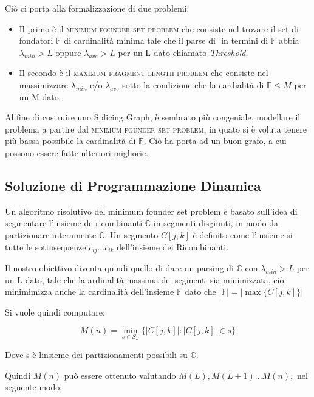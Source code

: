 Ciò ci porta alla formalizzazione di due problemi:

\begin{itemize}
    \item Il primo è il \textsc{minimum founder set problem} che consiste nel trovare il set di fondatori $\mathbb{F}$ di cardinalità minima tale che il parse di $\mathbb{}$ in termini di $\mathbb{F}$ abbia $\lambda_{min} > L$ oppure $\lambda_{ave} > L$ per un L dato chiamato \textit{Threshold}.
    
    \item Il secondo è il \textsc{maximum fragment length problem} che consiste nel massimizzare $\lambda_{min}$ e/o $\lambda_{ave}$ sotto la condizione che la cardialità di $\mathbb{F} \leq M $ per un M dato.
\end{itemize}

Al fine di costruire uno Splicing Graph, è sembrato più congeniale, modellare il problema a partire dal \textsc{minimum founder set problem}, in quato si è voluta tenere più bassa possibile la cardinalità di $\mathbb{F}$. Ciò ha porta ad un buon grafo, a cui possono essere fatte ulteriori migliorie.

\subsection{Soluzione di Programmazione Dinamica}
Un algoritmo risolutivo del minimum founder set problem è basato sull'idea di segmentare l'insieme de ricombinanti $\mathbb{C}$ in segmenti disgiunti, in modo da partizionare interamente $\mathbb{C}$. Un segmento $C[j,k]$ è definito come l'insieme si tutte le sottosequenze $c_{ij}...c_{ik}$ dell'insieme dei Ricombinanti. 

Il nostro obiettivo diventa quindi quello di dare un parsing di $\mathbb{C}$ con $\lambda_{min} > L$ per un L dato, tale che la ardinalità massima dei segmenti sia minimizzata, ciò minimimizza anche la cardinalità dell'insieme $\mathbb{F}$ dato che $|\mathbb{F}|=|\max\{C[j,k]\}|$

Si vuole quindi computare:

\begin{equation*}
    M(n)=\min_{s \in S_L}\{|C[j,k]| : |C[j,k]| \in s \} 
\end{equation*}

Dove s è linsieme dei partizionamenti possibili su $\mathbb{C}$.

Quindi $M(n)$ può essere ottenuto valutando $M(L),M(L+1)...M(n),$ nel seguente modo:

